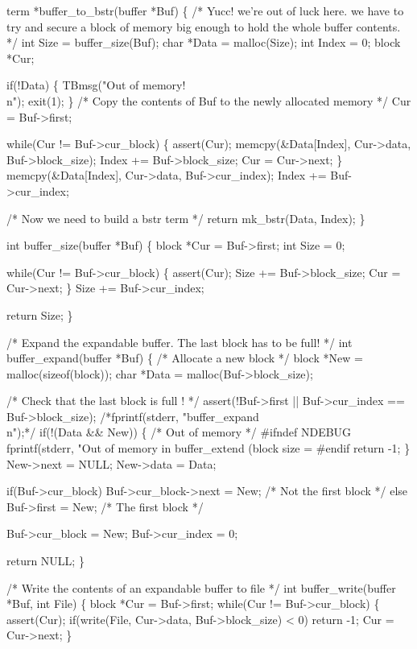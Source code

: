 term *buffer_to_bstr(buffer *Buf)
\{
  /* Yucc! we're out of luck here. we have to try and
     secure a block of memory big enough to hold the whole buffer
     contents.
  */
  int Size = buffer_size(Buf);
  char *Data = malloc(Size);
  int Index = 0;
  block *Cur;

  if(!Data)
    \{
      TBmsg("Out of memory!\\n");
      exit(1);
    \}
  /* Copy the contents of Buf to the newly allocated memory */
  Cur = Buf->first;

  while(Cur != Buf->cur_block)
    \{
      assert(Cur);
      memcpy(&Data[Index], Cur->data, Buf->block_size);
      Index += Buf->block_size;
      Cur = Cur->next;
    \}
  memcpy(&Data[Index], Cur->data, Buf->cur_index);
  Index += Buf->cur_index;

  /* Now we need to build a bstr term */
  return mk_bstr(Data, Index);
\}

int buffer_size(buffer *Buf)
\{
  block *Cur = Buf->first;
  int Size = 0;

  while(Cur != Buf->cur_block)
    \{
      assert(Cur);
      Size += Buf->block_size;
      Cur = Cur->next;
    \}
  Size += Buf->cur_index;

  return Size;
\}

/* Expand the expandable buffer. The last block has to be full! */
int buffer_expand(buffer *Buf)
\{
  /* Allocate a new block */
  block *New = malloc(sizeof(block));
  char *Data = malloc(Buf->block_size);

  /* Check that the last block is full ! */
  assert(!Buf->first || Buf->cur_index == Buf->block_size);
  /*fprintf(stderr, "buffer_expand\\n");*/
  if(!(Data && New))
    \{
      /* Out of memory */
      #ifndef NDEBUG
      fprintf(stderr, "Out of memory in buffer_extend (block size = %
      #endif
      return -1;
    \}
  New->next  = NULL;
  New->data  = Data;

  if(Buf->cur_block)
    Buf->cur_block->next = New; /* Not the first block */
  else
    Buf->first = New;           /* The first block */

  Buf->cur_block = New;
  Buf->cur_index = 0;

  return NULL;
\}

/* Write the contents of an expandable buffer to file */
int buffer_write(buffer *Buf, int File)
\{
  block *Cur = Buf->first;
  while(Cur != Buf->cur_block)
    \{
      assert(Cur);
      if(write(File, Cur->data, Buf->block_size) < 0)
        return -1;
      Cur = Cur->next;
    \}
  
